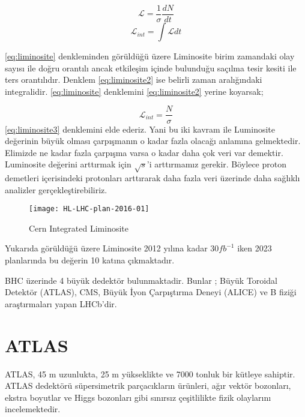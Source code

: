 \begin{equation}\label{eq:liminosite}
\mathcal{L}=\frac{1}{\sigma} \frac{dN}{dt}
\end{equation}
\begin{equation} \label{eq:liminosite2}
\mathcal{L}_{int}=\int \mathcal{L} dt
\end{equation}
\par \ref{eq:liminosite} denkleminden görüldüğü üzere Liminosite birim zamandaki olay sayısı ile doğru orantılı ancak etkileşim içinde bulunduğu saçılma tesir kesiti ile ters orantılıdır. Denklem \ref{eq:liminosite2} ise belirli zaman aralığındaki integralidir. \ref{eq:liminosite} denklemini \ref{eq:liminosite2} yerine koyarsak;

\begin{equation}\label{eq:liminosite3}
\mathcal{L}_{int} = \frac{N}{\sigma}
\end{equation}
\ref{eq:liminosite3} denklemini elde ederiz. Yani bu iki kavram ile Luminosite değerinin büyük olması çarpışmanın o kadar fazla olacağı anlamına gelmektedir. Elimizde ne kadar fazla çarpışma varsa o kadar daha çok veri var demektir. Luminosite değerini arttırmak için $\sqrt{s}$'i arttırmamız gerekir. Böylece proton demetleri içerisindeki protonları arttırarak daha fazla veri üzerinde daha sağlıklı analizler gerçekleştirebiliriz.

\begin{figure}[!htbp]
\begin{center}
\label{pic:liminosite}
\texttt{[image: HL-LHC-plan-2016-01]}
\caption{Cern Integrated Liminosite}
\end{center}
\end{figure}
Yukarıda görüldüğü üzere Liminosite 2012 yılına kadar $30 fb^{-1}$ iken 2023 planlarında bu değerin 10 katına çıkmaktadır.
\par BHC üzerinde 4 büyük dedektör bulunmaktadir. Bunlar ; Büyük Toroidal Detektör (ATLAS), CMS, Büyük İyon Çarpıştırma Deneyi (ALICE) ve B fiziği araştırmaları yapan LHCb’dir.

\section{ATLAS}
ATLAS, 45 m uzunlukta, 25 m yükseklikte ve 7000 tonluk bir kütleye sahiptir. ATLAS dedektörü süpersimetrik parçacıkların ürünleri, ağır vektör bozonları, ekstra boyutlar ve Higgs bozonları gibi sınırsız çeşitlilikte fizik olaylarını incelemektedir.

